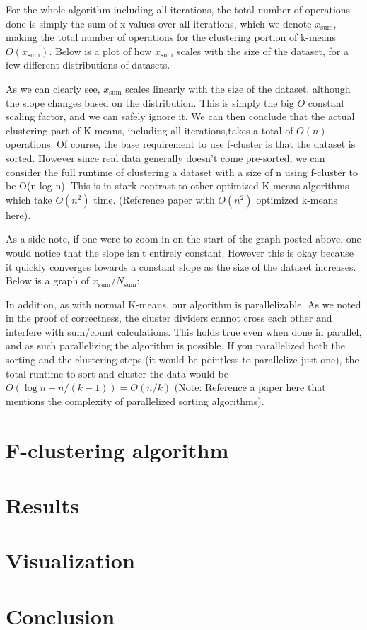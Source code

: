 \documentclass[conference,compsoc]{IEEEtran}
\begin{document}
For the whole algorithm including all iterations, the total number of operations done is simply the sum of x values over all iterations,
which we denote $x_\text{sum}$, making the total number of operations for the clustering portion of k-means $O(x_\text{sum})$.
Below is a plot of how $x_\text{sum}$ scales with the size of the dataset, for a few different distributions of datasets.



As we can clearly see, $x_\text{sum}$ scales linearly with the size of the dataset, although the slope changes based on the distribution.
This is simply the big $O$ constant scaling factor, and we can safely ignore it.
We can then conclude that the actual clustering part of K-means, including all iterations,takes a total of $O(n)$ operations.
Of course, the base requirement to use f-cluster is that the dataset is sorted.
However since real data generally doesn’t come pre-sorted, we can consider the full runtime of clustering a dataset with a size of n using f-cluster to be O(n log n).
This is in stark contrast to other optimized K-means algorithms which take $O(n^2)$ time. (Reference paper with $O(n^2)$ optimized k-means here).

As a side note, if one were to zoom in on the start of the graph posted above, one would notice that the slope isn’t entirely constant.
However this is okay because it quickly converges towards a constant slope as the size of the dataset increases. Below is a graph of $x_\text{sum}/N_\text{sum}$:

In addition, as with normal K-means, our algorithm is parallelizable.
As we noted in the proof of correctness, the cluster dividers cannot cross each other and interfere with sum/count calculations.
This holds true even when done in parallel, and as such parallelizing the algorithm is possible.
If you parallelized both the sorting and the clustering steps (it would be pointless to parallelize just one), 
the total runtime to sort and cluster the data would be $O(\log n + n/(k-1)) = O(n/k)$ (Note: Reference a paper here that mentions the complexity of parallelized sorting algorithms).

\section{F-clustering algorithm}

\section{Results}

\section{Visualization}

\section{Conclusion}
\end{document}
